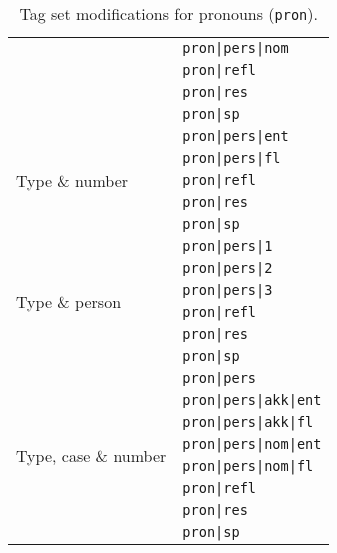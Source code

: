 \documentclass[a4paper,12pt,english]{book}
\begin{document}
\begin{appendices}
\begin{table}
\begin{tabular}{@{}ll@{}}
            & \texttt{pron|pers|nom} \\
            & \texttt{pron|refl} \\
            & \texttt{pron|res} \\
            & \texttt{pron|sp} \\
            \midrule
            \multirow{5}{*}{Type \& number}
            & \texttt{pron|pers|ent} \\
            & \texttt{pron|pers|fl} \\
            & \texttt{pron|refl} \\
            & \texttt{pron|res} \\
            & \texttt{pron|sp} \\
            \midrule
            \multirow{6}{*}{Type \& person}
            & \texttt{pron|pers|1} \\
            & \texttt{pron|pers|2} \\
            & \texttt{pron|pers|3} \\
            & \texttt{pron|refl} \\
            & \texttt{pron|res} \\
            & \texttt{pron|sp} \\
            \midrule
            \multirow{8}{*}{Type, case \& number}
            & \texttt{pron|pers} \\
            & \texttt{pron|pers|akk|ent} \\
            & \texttt{pron|pers|akk|fl} \\
            & \texttt{pron|pers|nom|ent} \\
            & \texttt{pron|pers|nom|fl} \\
            & \texttt{pron|refl} \\
            & \texttt{pron|res} \\
            & \texttt{pron|sp} \\
            \bottomrule
        \end{tabular}
        \caption{Tag set modifications for pronouns (\texttt{pron}).}
        \label{prontagsets}
    \end{table}
\end{appendices}

\backmatter


\end{document}
